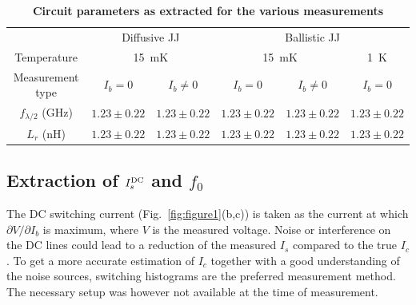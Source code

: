 \begin{table}
	\centering
	\caption{\textbf{Circuit parameters as extracted for the various measurements}}
	\begin{tabular}{cccccc}
		\hline\hline
		& \multicolumn{2}{c}{Diffusive JJ} & \multicolumn{3}{c}{Ballistic JJ}  \\
		Temperature & \multicolumn{2}{c}{\SI{15}{\milli\kelvin}} & \multicolumn{2}{c}{\SI{15}{\milli\kelvin}} & \SI{1}{\kelvin} \\
		Measurement type & $I_b=0$ & $I_b\neq 0$ & $I_b=0$ & $I_b\neq 0$ & $I_b=0$ \\
		\hline
		$f_{\lambda/2}$ (\si{\giga\hertz}) & $1.23\pm0.22$ & $1.23\pm0.22$ & $1.23\pm0.22$ & $1.23\pm0.22$ & $1.23\pm0.22$ \\
		$L_r$ (\si{\nano\henry}) & $1.23\pm0.22$ & $1.23\pm0.22$ & $1.23\pm0.22$ & $1.23\pm0.22$ & $1.23\pm0.22$ \\
		\hline\hline
	\end{tabular}
	\label{tab:frLr2}
\end{table}

\subsection{Extraction of $I_s^{\rm DC}$ and $f_0$}\label{sec:extraction}

The DC switching current (Fig.~\ref{fig:figure1}(b,c)) is taken as the current at which $\partial V/\partial I_b$ is maximum, where $V$ is the measured voltage.
%
Noise or interference on the DC lines could lead to a reduction of the measured $I_s$ compared to the true $I_c$.
%
To get a more accurate estimation of $I_c$ together with a good understanding of the noise sources, switching histograms are the preferred measurement method.
%
The necessary setup was however not available at the time of measurement.

